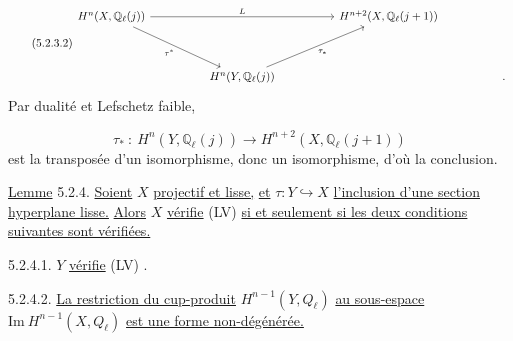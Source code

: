 \begin{equation}\tag{5.2.3.2}
\begin{tikzcd}[column sep=huge, row sep=huge]
H^n(X,\mathbb{Q}_\ell(j)) \arrow[rr, "L"] \arrow[dr, "\tau^*"'] & {} & H^{n+2}(X,\mathbb{Q}_\ell(j+1)) \\
{} & H^n(Y,\mathbb{Q}_\ell(j)) \arrow[ur, "\tau_*"'] & {} & {.}
\end{tikzcd}
\end{equation}
Par dualité et Lefschetz faible,

\begin{equation*}
\tau_* \ :\ H^n(Y,\mathbb{Q}_\ell(j)) \longrightarrow H^{n+2}(X,\mathbb{Q}_\ell(j+1))
\end{equation*}
est la transposée d'un isomorphisme, donc un isomorphisme, d'où la conclusion.

\underline{Lemme} 5.2.4.  \underline{Soient} $X$ \underline{projectif et lisse,} \underline{et} $\tau : Y \hookrightarrow X$ \underline{l'inclusion d'une section hyperplane lisse.} \underline{Alors} $X$ \underline{vérifie} (LV) \underline{si et seulement si les deux conditions suivantes sont vérifiées.}

5.2.4.1.  $Y$ \underline{vérifie} (LV) .

5.2.4.2.  \underline{La restriction du cup-produit} $H^{n-1}(Y,Q_\ell)$ \underline{au sous-espace} $\mathrm{Im}\ H^{n-1}(X,Q_\ell)$ \underline{est une forme non-dégénérée.}

